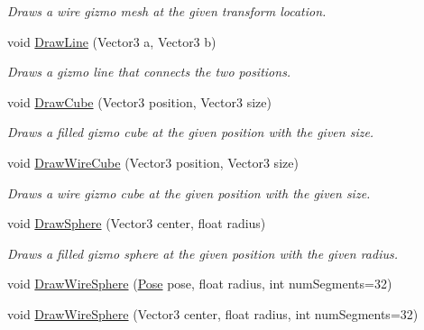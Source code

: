 \begin{DoxyCompactItemize}
\begin{DoxyCompactList}\small\item\em Draws a wire gizmo mesh at the given transform location. \end{DoxyCompactList}\item 
void \mbox{\hyperlink{class_leap_1_1_unity_1_1_runtime_gizmos_1_1_runtime_gizmo_drawer_a7e1e78b8cec3277c218cf05af7b43aae}{Draw\+Line}} (Vector3 a, Vector3 b)
\begin{DoxyCompactList}\small\item\em Draws a gizmo line that connects the two positions. \end{DoxyCompactList}\item 
void \mbox{\hyperlink{class_leap_1_1_unity_1_1_runtime_gizmos_1_1_runtime_gizmo_drawer_a82095c769cf2c976da1174211b71e9ae}{Draw\+Cube}} (Vector3 position, Vector3 size)
\begin{DoxyCompactList}\small\item\em Draws a filled gizmo cube at the given position with the given size. \end{DoxyCompactList}\item 
void \mbox{\hyperlink{class_leap_1_1_unity_1_1_runtime_gizmos_1_1_runtime_gizmo_drawer_a21e5f710bde78731cd5061a45b3869c6}{Draw\+Wire\+Cube}} (Vector3 position, Vector3 size)
\begin{DoxyCompactList}\small\item\em Draws a wire gizmo cube at the given position with the given size. \end{DoxyCompactList}\item 
void \mbox{\hyperlink{class_leap_1_1_unity_1_1_runtime_gizmos_1_1_runtime_gizmo_drawer_acdd890c95db06e3d95bbafd740ed11ef}{Draw\+Sphere}} (Vector3 center, float radius)
\begin{DoxyCompactList}\small\item\em Draws a filled gizmo sphere at the given position with the given radius. \end{DoxyCompactList}\item 
void \mbox{\hyperlink{class_leap_1_1_unity_1_1_runtime_gizmos_1_1_runtime_gizmo_drawer_a37f724a49840d699acbfb538883132ef}{Draw\+Wire\+Sphere}} (\mbox{\hyperlink{struct_leap_1_1_unity_1_1_pose}{Pose}} pose, float radius, int num\+Segments=32)
\item 
void \mbox{\hyperlink{class_leap_1_1_unity_1_1_runtime_gizmos_1_1_runtime_gizmo_drawer_a39a6bcebf95fe56c25c228b2909fe77e}{Draw\+Wire\+Sphere}} (Vector3 center, float radius, int num\+Segments=32)

\end{DoxyCompactItemize}
